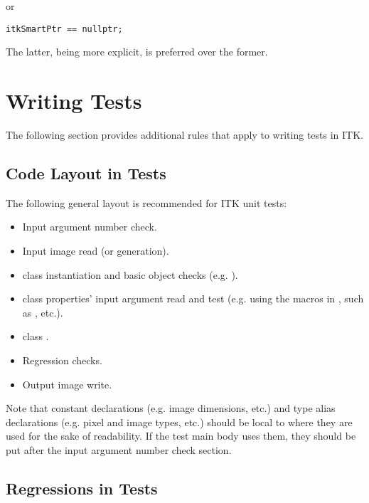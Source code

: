 or

\small
\begin{verbatim}
itkSmartPtr == nullptr;
\end{verbatim}
\normalsize

The latter, being more explicit, is preferred over the former.

\section{Writing Tests}
\label{sec:WritingTests}

The following section provides additional rules that apply to writing tests
in ITK.


\subsection{Code Layout in Tests}
\label{subsec:CodeLayoutInTests}

The following general layout is recommended for ITK unit tests:
\begin{itemize}
\item Input argument number check.
\item Input image read (or generation).
\item {} class instantiation and basic object checks (e.g.
).
\item {} class properties' input argument read and test (e.g. using the
macros in , such as , etc.).
\item {} class .
\item Regression checks.
\item Output image write.
\end{itemize}

Note that constant declarations (e.g. image dimensions, etc.) and
type alias declarations (e.g. pixel and image types, etc.) should be local
to where they are used for the sake of readability. If the test main body uses
them, they should be put after the input argument number check section.


\subsection{Regressions in Tests}
\label{subsec:RegressionsInTests}

